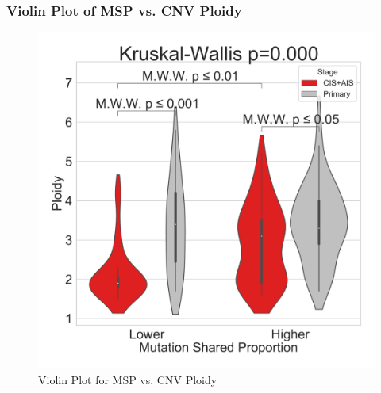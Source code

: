 \documentclass{beamer}
\begin{document}
    \begin{frame}
        \frametitle{Violin Plot of MSP vs. CNV Ploidy}

        \begin{figure}
            \includegraphics[width=0.4 \linewidth]{figures/MutationSharedProportion_CNV/Ploidy/CopyNumber.BWA.Sequenza.SQC.median/Violin_Mutation Shared Proportion.pdf}
            \caption{Violin Plot for MSP vs. CNV Ploidy}
        \end{figure}
    \end{frame}
\end{document}
